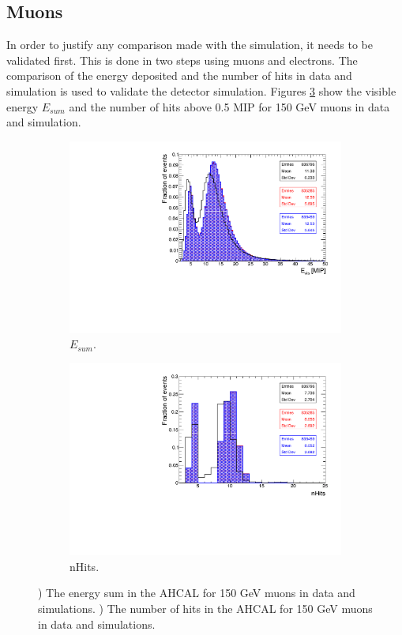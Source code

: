 \subsection{Muons}

In order to justify any comparison made with the simulation, it needs to be validated first. This is done in two steps using muons and electrons. The comparison of the energy deposited and the number of hits in data and simulation is used to validate the detector simulation. Figures \ref{fig:muVal} show the visible energy $E_{sum}$ and the number of hits above 0.5 MIP for 150 GeV muons in data and simulation.

\begin{figure}[htbp!]
  \centering
  \begin{subfigure}[t]{0.49\textwidth}
    \includegraphics[width=1.\linewidth]{chap5/fig_AHCAL_Timing/Muons/Validation_Evis_Muons.pdf}
    \caption{$E_{sum}$.} \label{fig:muEvis}
  \end{subfigure}
  \hfill
  \begin{subfigure}[t]{0.49\textwidth}
    \includegraphics[width=1.\linewidth]{chap5/fig_AHCAL_Timing/Muons/Validation_nHits_Muons.pdf}
    \caption{nHits.} \label{fig:munHits}
  \end{subfigure}
  \caption{) The energy sum in the AHCAL for 150 GeV muons in data and simulations. ) The number of hits in the AHCAL for 150 GeV muons in data and simulations.}
  \label{fig:muVal}
\end{figure}


